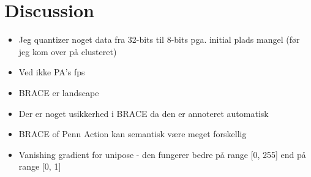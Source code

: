 \documentclass[./main.tex]{subfiles}
\begin{document}
\section{Discussion}
\begin{itemize}
    \item Jeg quantizer noget data fra 32-bits til 8-bits pga. initial plads mangel (før jeg kom over på clusteret)
    \item Ved ikke PA's fps
    \item BRACE er landscape
    \item Der er noget usikkerhed i BRACE da den er annoteret automatisk
    \item BRACE of Penn Action kan semantisk være meget forskellig
    \item Vanishing gradient for unipose - den fungerer bedre på range [0, 255] end på range [0, 1]
\end{itemize}
\end{document}
